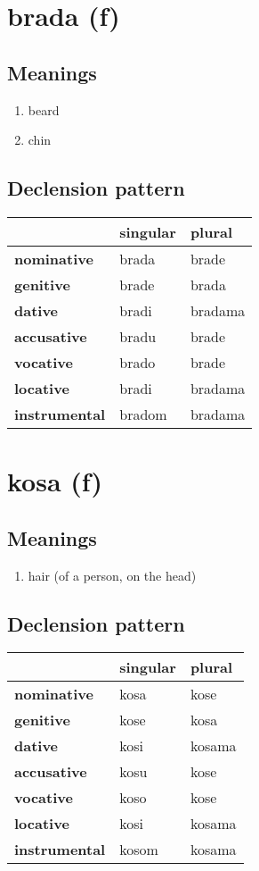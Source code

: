 \filbreak
\section{brada (f)}
\subsection*{Meanings}
\begin{enumerate}
\item beard
\item chin
\end{enumerate}
\subsection*{Declension pattern}
\begin{tabularx}{\linewidth}{Xll}
\toprule
{} & singular &   plural \\
\midrule
\textbf{nominative  } &    brada &    brade \\
\textbf{genitive    } &    brade &    brada \\
\textbf{dative      } &    bradi &  bradama \\
\textbf{accusative  } &    bradu &    brade \\
\textbf{vocative    } &    brado &    brade \\
\textbf{locative    } &    bradi &  bradama \\
\textbf{instrumental} &   bradom &  bradama \\
\bottomrule
\end{tabularx}

\filbreak
\section{kosa (f)}
\subsection*{Meanings}
\begin{enumerate}
\item hair (of a person, on the head)
\end{enumerate}
\subsection*{Declension pattern}
\begin{tabularx}{\linewidth}{Xll}
\toprule
{} & singular &  plural \\
\midrule
\textbf{nominative  } &     kosa &    kose \\
\textbf{genitive    } &     kose &    kosa \\
\textbf{dative      } &     kosi &  kosama \\
\textbf{accusative  } &     kosu &    kose \\
\textbf{vocative    } &     koso &    kose \\
\textbf{locative    } &     kosi &  kosama \\
\textbf{instrumental} &    kosom &  kosama \\
\bottomrule
\end{tabularx}

